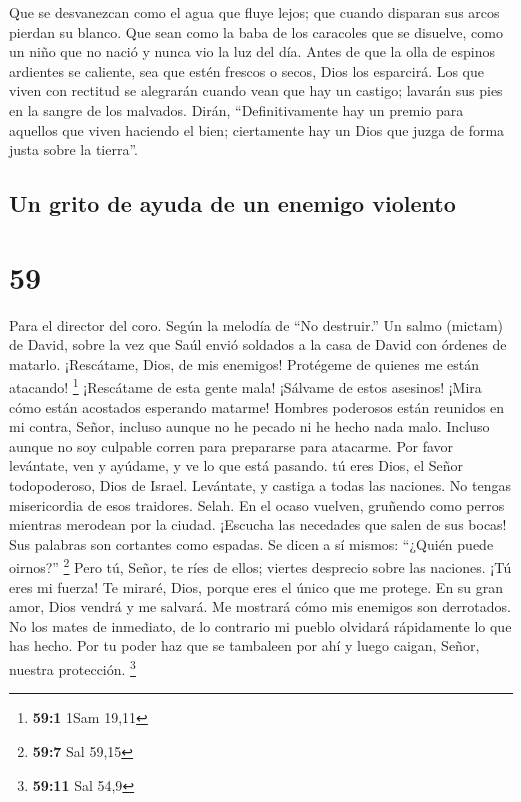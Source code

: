 Que se desvanezcan como el agua que fluye lejos; que cuando
disparan sus arcos pierdan su blanco.  Que sean como la baba
de los caracoles que se disuelve, como un niño que no nació y nunca vio
la luz del día.  Antes de que la olla de espinos ardientes
se caliente, sea que estén frescos o secos, Dios los esparcirá.
 Los que viven con rectitud se alegrarán cuando vean que
hay un castigo; lavarán sus pies en la sangre de los malvados.
 Dirán, ``Definitivamente hay un premio para aquellos que
viven haciendo el bien; ciertamente hay un Dios que juzga de forma justa
sobre la tierra''.

\hypertarget{un-grito-de-ayuda-de-un-enemigo-violento}{%
\subsection{Un grito de ayuda de un enemigo
violento}\label{un-grito-de-ayuda-de-un-enemigo-violento}}

\hypertarget{section-58}{%
\section{59}\label{section-58}}

Para el director del coro. Según la melodía de ``No destruir.'' Un salmo
(mictam) de David, sobre la vez que Saúl envió soldados a la casa de
David con órdenes de matarlo.  ¡Rescátame, Dios, de mis
enemigos! Protégeme de quienes me están atacando! \footnote{\textbf{59:1}
  1Sam 19,11}  ¡Rescátame de esta gente mala! ¡Sálvame de
estos asesinos!  ¡Mira cómo están acostados esperando
matarme! Hombres poderosos están reunidos en mi contra, Señor, incluso
aunque no he pecado ni he hecho nada malo.  Incluso aunque
no soy culpable corren para prepararse para atacarme. Por favor
levántate, ven y ayúdame, y ve lo que está pasando.  tú eres
Dios, el Señor todopoderoso, Dios de Israel. Levántate, y castiga a
todas las naciones. No tengas misericordia de esos traidores. Selah.
 En el ocaso vuelven, gruñendo como perros mientras merodean
por la ciudad.  ¡Escucha las necedades que salen de sus
bocas! Sus palabras son cortantes como espadas. Se dicen a sí mismos:
``¿Quién puede oirnos?'' \footnote{\textbf{59:7} Sal 59,15} 
Pero tú, Señor, te ríes de ellos; viertes desprecio sobre las naciones.
 ¡Tú eres mi fuerza! Te miraré, Dios, porque eres el único
que me protege.  En su gran amor, Dios vendrá y me salvará.
Me mostrará cómo mis enemigos son derrotados.  No los mates
de inmediato, de lo contrario mi pueblo olvidará rápidamente lo que has
hecho. Por tu poder haz que se tambaleen por ahí y luego caigan, Señor,
nuestra protección. \footnote{\textbf{59:11} Sal 54,9}

